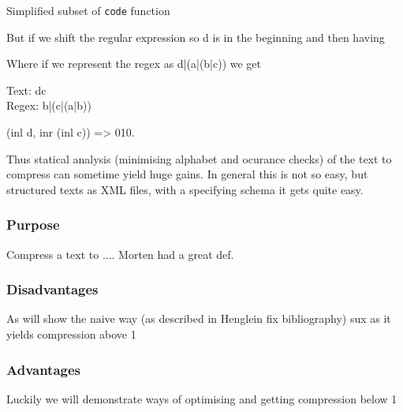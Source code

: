 \documentclass[slidestop,compress,mathserif, xcolor=table]{beamer}
\begin{document}
\begin{frame}

  \begin{block}{Simplified subset of \texttt{code} function}
\begin{semiverbatim}
\end{semiverbatim}
  \end{block}
  
  But if we shift the regular expression so d is in the beginning and then having 

  Where if we represent the regex as d|(a|(b|c)) we get

  \begin{example}
    Text: dc\\
    Regex: b|(c|(a|b))

  \end{example}

  (inl d, inr (inl c)) => 010.

  Thus statical analysis (minimising alphabet and ocurance checks) of the text
  to compress can sometime yield huge gains.
  In general this is not so easy, but structured texts as XML files, with a
  specifying schema it gets quite easy.

\end{frame}

\begin{frame}
  \frametitle{Purpose}

  \begin{definition}
    Compress a text to .... Morten had a great def.
  \end{definition}
\end{frame}

\begin{frame}
  \frametitle{Disadvantages}
  
  As will show the naive way (as described in Henglein fix bibliography) sux as it yields compression above 1

\end{frame}

\begin{frame}
  \frametitle{Advantages}
  
  Luckily we will demonstrate ways of optimising and getting compression below 1
  
\end{frame}
\end{document}
